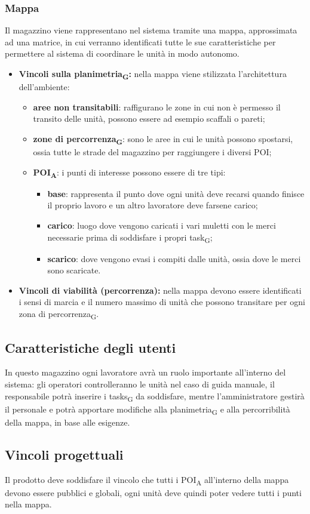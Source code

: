 \subsubsection{Mappa}
Il magazzino viene rappresentano nel sistema tramite una mappa, approssimata ad una matrice, in cui verranno identificati tutte le sue caratteristiche per permettere al sistema di coordinare le unità in modo autonomo.
\begin{itemize}
	\item \textbf{Vincoli sulla \gls{planimetria}\textsubscript{G}:} nella mappa viene stilizzata l'architettura dell'ambiente:
	\begin{itemize}
		\item \textbf{aree non transitabili}: raffigurano le zone in cui non è permesso il transito delle unità, possono essere ad esempio scaffali o pareti;
		\item \textbf{zone di \gls{percorrenza}\textsubscript{G}}: sono le aree in cui le unità possono spostarsi, ossia tutte le strade del magazzino per raggiungere i diversi POI;
		\item \textbf{\acrshort{POI}\textsubscript{A}}: i punti di interesse possono essere di tre tipi:
		\begin{itemize}
			\item \textbf{base}: rappresenta il punto dove ogni unità deve recarsi quando finisce il proprio lavoro e un altro lavoratore deve farsene carico;
			\item \textbf{carico}: luogo dove vengono caricati i vari muletti con le merci necessarie prima di soddisfare i propri \gls{task}\textsubscript{G};
			\item \textbf{scarico}: dove vengono evasi i compiti dalle unità, ossia dove le merci sono scaricate.
		\end{itemize}
	\end{itemize}
	\item \textbf{Vincoli di viabilità (percorrenza):} nella mappa devono essere identificati i sensi di marcia e il numero massimo di unità che possono transitare per ogni zona di \gls{percorrenza}\textsubscript{G}.
	
\end{itemize}

\subsection{Caratteristiche degli utenti}
In questo magazzino ogni lavoratore avrà un ruolo importante all'interno del sistema: gli operatori controlleranno le unità nel caso di guida manuale, il responsabile potrà inserire i \glspl{task}\textsubscript{G} da soddisfare, mentre l'amministratore gestirà il personale e potrà apportare modifiche alla \gls{planimetria}\textsubscript{G} e alla percorribilità della mappa, in base alle esigenze.
\subsection{Vincoli progettuali}
Il prodotto deve soddisfare il vincolo che tutti i \acrshort{POI}\textsubscript{A} all'interno della mappa devono essere pubblici e globali, ogni unità deve quindi poter vedere tutti i punti nella mappa.